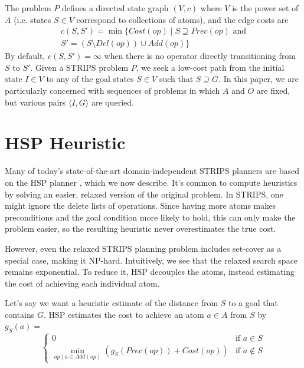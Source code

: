 \documentclass[letterpaper]{article}
\begin{document}
The problem $P$ defines a directed state graph $(V,c)$ where $V$ is the power set of $A$ (i.e. states $S\in V$ correspond to collections of atoms), and the edge costs are
\begin{eqnarray*} c(S,S') = \min\{Cost(op) \mid S\supseteq Prec(op)\text{ and}
\\S' = \left(S \setminus Del(op)\right) \cup Add(op)\} \end{eqnarray*}
By default, $c(S,S') = \infty$ when there is no operator directly transitioning from $S$ to $S'$.
Given a STRIPS problem $P$, we seek a low-cost path from the initial state $I\in V$ to any of the goal states $S\in V$ such that $S \supseteq G$. In this paper, we are particularly concerned with sequences of problems in which $A$ and $O$ are fixed, but various pairs $\langle I,G\rangle$ are queried.

\section{HSP Heuristic}

Many of today's state-of-the-art domain-independent STRIPS planners are based on the HSP planner \cite{bonet2001planning}, which we now describe.
It's common to compute heuristics by solving an easier, relaxed version of the original problem. In STRIPS, one might ignore the delete lists of operations.
Since having more atoms makes preconditions and the goal condition more likely to hold, this can only make the problem easier, so the resulting heuristic never overestimates the true cost.

However, even the relaxed STRIPS planning problem includes set-cover as a special case, making it NP-hard.
Intuitively, we see that the relaxed search space remains exponential.
To reduce it, HSP decouples the atoms, instead estimating the cost of achieving each individual atom.

Let's say we want a heuristic estimate of the distance from $S$ to a goal that contains $G$. HSP estimates the cost to achieve an atom $a\in A$ from $S$ by $g_S(a) = $
\[\begin{cases} 0  &\mbox{if } a \in S
\\ \min_{op\mid a\in Add(op)} \left(g_S(Prec(op)) + Cost(op)\right)  &\mbox{if } a \notin S \end{cases}\]
\end{document}
